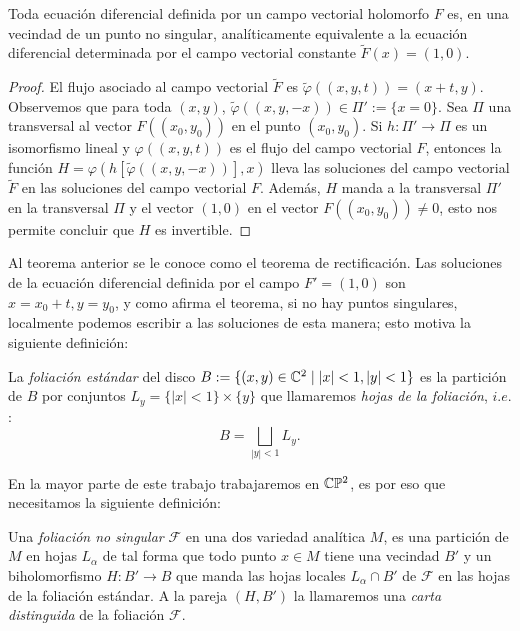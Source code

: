 \begin{Teorema}
\label{Teo:Rectificacion}
Toda ecuación diferencial definida por un campo vectorial holomorfo $F$ es, en una vecindad de un punto no singular, analíticamente equivalente a la ecuación diferencial determinada por el campo vectorial constante $\tilde{F}(x)=(1,0)$.
\end{Teorema}
\begin{proof}
  El flujo asociado al campo vectorial $\tilde{F}$ es $\tilde{\varphi}((x,y,t))=(x+t,y)$. Observemos que para toda $(x,y)$, $\tilde{\varphi}((x,y,-x))\in\Pi':=\{x=0\}$. Sea $\Pi$ una transversal al vector $F((x_{0},y_{0}))$ en el punto $(x_{0},y_{0})$. Si $h\colon\Pi'\rightarrow\Pi$ es un isomorfismo lineal y $\varphi((x,y,t))$ es el flujo del campo vectorial $F$, entonces la función $H=\varphi(h[\tilde{\varphi}((x,y,-x))],x)$ lleva las soluciones del campo vectorial $\tilde{F}$ en las soluciones del campo vectorial $F$. Además, $H$ manda a la transversal $\Pi'$ en la transversal $\Pi$ y el vector $(1,0)$ en el vector $F((x_{0},y_{0}))\neq 0$, esto nos permite concluir que $H$ es invertible.   
\end{proof}
Al teorema anterior se le conoce como el teorema de rectificación. Las soluciones de la ecuación diferencial definida por el campo $F'=(1,0)$ son $x=x_{0}+t,y=y_{0}$, y como afirma el teorema, si no hay puntos singulares, localmente podemos escribir a las soluciones de esta manera; esto motiva la siguiente definición:

\begin{defn}
\label{Def:FoliacionEstandar}
La \emph{foliación estándar} del disco $B:=\{(x,y)\in\mathbb{C}^{2} \mid \left|x\right|<1, \left|y\right|<1 \}$ es la partición de $B$ por conjuntos $L_{y}=\{ \left|x\right|<1 \}\times\{y \} $ que llamaremos \emph{hojas de la foliación}, $\mathit{i.e.}$:
\begin{equation*}
B=\bigsqcup_{\left|y\right|<1}L_{y}.
\end{equation*}
\end{defn}

En la mayor parte de este trabajo trabajaremos en $\mathbb{C}\mathbb{P}^2$, es por eso que necesitamos la siguiente definición:

\begin{defn}
\label{Def:FoliacionNoSingular}
Una \emph{foliación no singular} $\mathcal{F}$ en una dos variedad analítica $M$, es una partición de $M$ en hojas $L_{\alpha}$ de tal forma que todo punto $x\in M$ tiene una vecindad $B'$ y un biholomorfismo $H\colon B'\rightarrow B $ que manda las hojas locales $L_{\alpha}\cap B'$ de $\mathcal{F}$ en las hojas de la foliación estándar. A la pareja $(H,B')$ la llamaremos una \emph{carta distinguida} de la foliación $\mathcal{F}$.
\end{defn}

